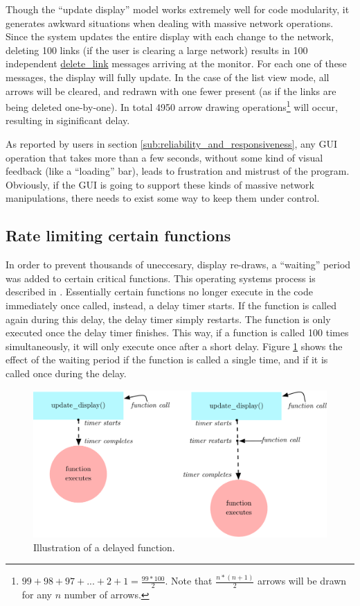 Though the ``update display'' model works extremely well for code modularity, it generates awkward situations when dealing with massive network operations. Since the system updates the entire display with each change to the network, deleting 100 links (if the user is clearing a large network) results in 100 independent \url{delete_link} messages arriving at the monitor. For each one of these messages, the display will fully update. In the case of the list view mode, all arrows will be cleared, and redrawn with one fewer present (as if the links are being deleted one-by-one). In total 4950 arrow drawing operations\footnote{$99 + 98 + 97 + ... + 2 + 1 = \frac{99*100}{2}$. Note that $\frac{n*(n+1)}{2}$ arrows will be drawn for any $n$ number of arrows.} will occur, resulting in siginificant delay. 

As reported by users in section \ref{sub:reliability_and_responsiveness}, any GUI operation that takes more than a few seconds, without some kind of visual feedback (like a ``loading'' bar), leads to frustration and mistrust of the program. Obviously, if the GUI is going to support these kinds of massive network manipulations, there needs to exist some way to keep them under control.

	\subsection{Rate limiting certain functions} %
	\label{sub:rate_limiting_certain_functions}

In order to prevent thousands of uneccesary, display re-draws, a ``waiting'' period was added to certain critical functions. This operating systems process is described in . Essentially certain functions no longer execute in the code immediately once called, instead, a delay timer starts. If the function is called again during this delay, the delay timer simply restarts. The function is only executed once the delay timer finishes. This way, if a function is called 100 times simultaneously, it will only execute once after a short delay. Figure \ref{fig:waiting_period} shows the effect of the waiting period if the function is called a single time, and if it is called once during the delay.

\begin{figure}[ht]
	\centering
		\includegraphics[width=1\textwidth]{figures/waiting_period}
		\caption{Illustration of a delayed function.}
		\label{fig:waiting_period}
\end{figure}

